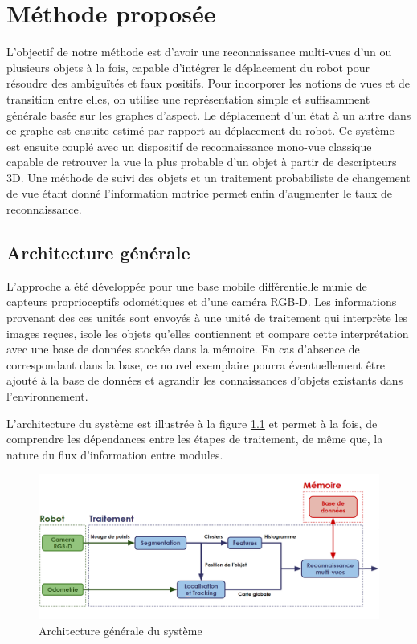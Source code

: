 
\chapter{Méthode proposée}

L'objectif de notre méthode est d'avoir une reconnaissance multi-vues d'un ou plusieurs objets à la fois, capable d'intégrer le déplacement du robot pour résoudre des ambiguïtés et faux positifs. Pour incorporer les notions de vues et de transition entre elles, on utilise une représentation simple et suffisamment générale basée sur les graphes d'aspect. Le déplacement d'un état à un autre dans ce graphe est ensuite estimé par rapport au déplacement du robot. Ce système est ensuite couplé avec un dispositif de reconnaissance mono-vue classique capable de retrouver la vue la plus probable d'un objet à partir de descripteurs 3D. Une méthode de suivi des objets et un traitement probabiliste de changement de vue étant donné l'information motrice permet enfin d'augmenter le taux de reconnaissance.

\section{Architecture générale}
L'approche a été développée pour une base mobile différentielle munie de capteurs proprioceptifs odométiques et d'une caméra RGB-D. Les informations provenant des ces unités sont envoyés à une unité de traitement qui interprète les images reçues, isole les objets qu'elles contiennent et compare cette interprétation avec une base de données stockée dans la mémoire. En cas d'absence de correspondant dans la base, ce nouvel exemplaire pourra éventuellement être ajouté à la base de données et agrandir les connaissances d'objets existants dans l'environnement.

L'architecture du système est illustrée à la figure \ref{fig:architecture} et permet à la fois, de comprendre les dépendances entre les étapes de traitement, de même que, la nature du flux d'information entre modules.

\begin{figure}[H]
  \centering
  \includegraphics[width=\textwidth]{gen_arc.png}
  \caption{Architecture générale du système}
  \label{fig:architecture}
\end{figure}


